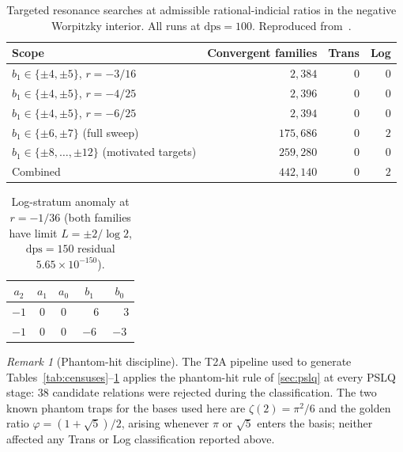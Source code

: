 \documentclass[11pt]{amsart}
\theoremstyle{definition}
\theoremstyle{remark}
\newtheorem{remark}[theorem]{Remark}
\newcommand{\dps}{\mathrm{dps}}
\begin{document}
\begin{table}[t]
\centering
\caption{Targeted resonance searches at admissible rational-indicial
ratios in the negative Worpitzky interior. All runs at $\dps=100$.
Reproduced from~\cite{TRINote}.}
\label{tab:resonance}
\begin{tabular}{lrrr}
\toprule
Scope & Convergent families & Trans & Log \\
\midrule
$b_1\in\{\pm4,\pm5\}$, $r=-3/16$ & $2{,}384$ & $0$ & $0$ \\
$b_1\in\{\pm4,\pm5\}$, $r=-4/25$ & $2{,}396$ & $0$ & $0$ \\
$b_1\in\{\pm4,\pm5\}$, $r=-6/25$ & $2{,}394$ & $0$ & $0$ \\
\midrule
$b_1\in\{\pm6,\pm7\}$ (full sweep) & $175{,}686$ & $0$ & $2$ \\
$b_1\in\{\pm8,\dots,\pm12\}$ (motivated targets)
                                 & $259{,}280$ & $0$ & $0$ \\
\midrule
Combined                          & $442{,}140$ & $0$ & $2$ \\
\bottomrule
\end{tabular}
\end{table}

\begin{table}[t]
\centering
\caption{Log-stratum anomaly at $r=-1/36$
(both families have limit $L=\pm 2/\log 2$, $\dps=150$ residual
$5.65\!\times\!10^{-150}$).}
\label{tab:log-anomaly}
\begin{tabular}{ccccc}
\toprule
$a_2$ & $a_1$ & $a_0$ & $b_1$ & $b_0$ \\
\midrule
$-1$ & $0$ & $0$ & $\phantom{-}6$ & $\phantom{-}3$ \\
$-1$ & $0$ & $0$ & $-6$ & $-3$ \\
\bottomrule
\end{tabular}
\end{table}

\begin{remark}[Phantom-hit discipline]\label{rem:phantom-discipline}
The T2A pipeline used to generate Tables~\ref{tab:censuses}--\ref{tab:resonance}
applies the phantom-hit rule of \textsection\ref{sec:pslq} at every
PSLQ stage: $38$ candidate relations were rejected during the
classification.  The two known phantom traps for the bases used here
are $\zeta(2) = \pi^2/6$ and the golden ratio $\varphi=(1+\sqrt{5})/2$,
arising whenever $\pi$ or $\sqrt 5$ enters the basis; neither affected
any Trans or Log classification reported above.
\end{remark}
\end{document}
